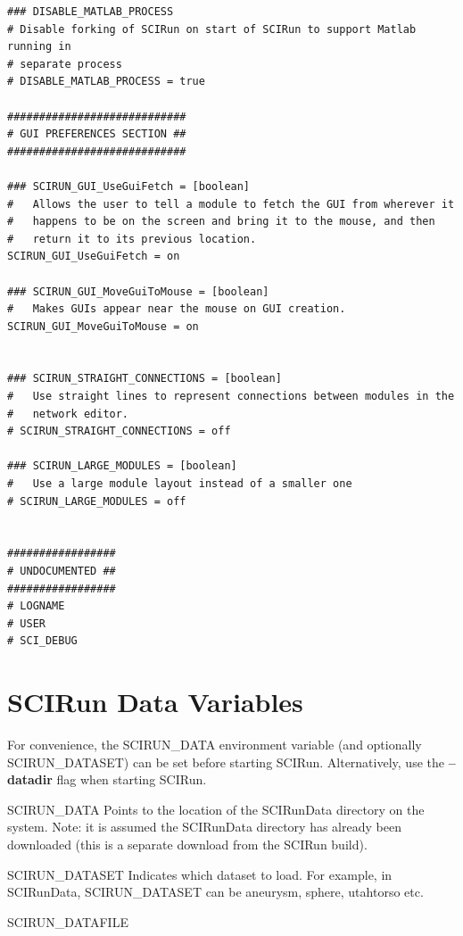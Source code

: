 \documentclass[fleqn,12pt,openany]{book}
\begin{document}
\begin{verbatim}
### DISABLE_MATLAB_PROCESS
# Disable forking of SCIRun on start of SCIRun to support Matlab running in
# separate process
# DISABLE_MATLAB_PROCESS = true

############################
# GUI PREFERENCES SECTION ##
############################

### SCIRUN_GUI_UseGuiFetch = [boolean]
#   Allows the user to tell a module to fetch the GUI from wherever it
#   happens to be on the screen and bring it to the mouse, and then
#   return it to its previous location.
SCIRUN_GUI_UseGuiFetch = on

### SCIRUN_GUI_MoveGuiToMouse = [boolean] 
#   Makes GUIs appear near the mouse on GUI creation. 
SCIRUN_GUI_MoveGuiToMouse = on


### SCIRUN_STRAIGHT_CONNECTIONS = [boolean]
#   Use straight lines to represent connections between modules in the
#   network editor.
# SCIRUN_STRAIGHT_CONNECTIONS = off

### SCIRUN_LARGE_MODULES = [boolean]
#   Use a large module layout instead of a smaller one
# SCIRUN_LARGE_MODULES = off


#################
# UNDOCUMENTED ##
#################
# LOGNAME
# USER
# SCI_DEBUG
\end{verbatim}

\section{SCIRun Data Variables}

For convenience, the SCIRUN\_DATA environment variable (and optionally SCIRUN\_DATASET) can be set before starting SCIRun.
Alternatively, use the \textbf{--datadir} flag when starting SCIRun.


\begin{customdesc}
\item[SCIRUN\_DATA]
Points to the location of the SCIRunData directory on the system.
Note: it is assumed the SCIRunData directory has already been downloaded
(this is a separate download from the SCIRun build).
\item[SCIRUN\_DATASET]
Indicates which dataset to load.
For example, in SCIRunData, SCIRUN\_DATASET can be aneurysm, sphere, utahtorso etc.
\item[SCIRUN\_DATAFILE]
\end{customdesc}
\end{document}
